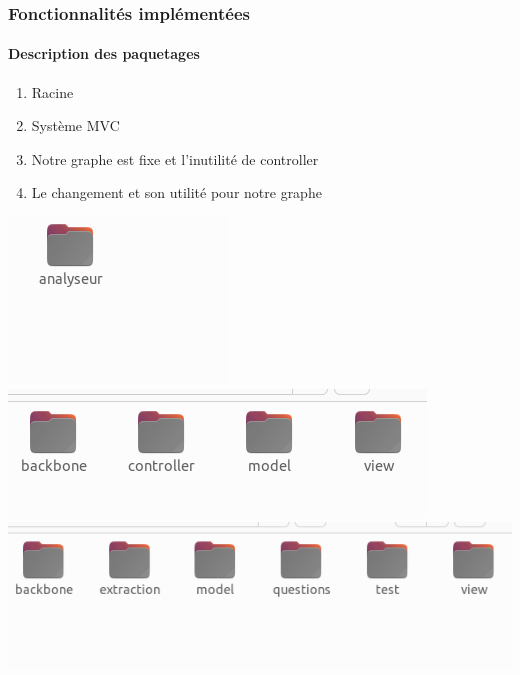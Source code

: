 \documentclass{beamer}
\begin{document}
\begin{frame}
	\frametitle{Fonctionnalités implémentées}
	\framesubtitle{Description des paquetages}
	\begin{minipage}[t]{0.5\linewidth}
		\begin{enumerate}
			\item Racine
			\item Système MVC
			\item Notre graphe est fixe et l'inutilité de controller 
			\item Le changement et son utilité pour notre graphe 
		\end{enumerate}
	\end{minipage}
	\begin{minipage}[t]{0.35\linewidth}
		\begin{flushright}
			\includegraphics[width =\linewidth]{images/image.png}
			\vspace{1em}
			\includegraphics[width =\linewidth]{images/image3.png}
			\vspace{1em}			
			\includegraphics[width =\linewidth]{images/image2.png}
			\vspace{1em}
		\end{flushright}
	\end{minipage}
\end{frame}
\end{document}
